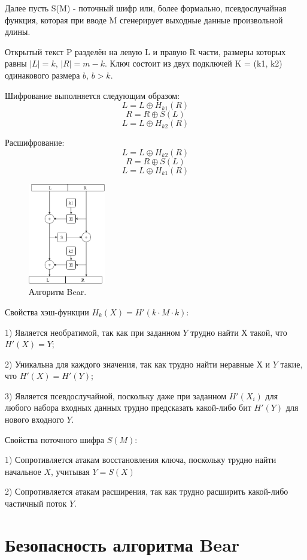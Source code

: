 \documentclass[12pt]{article}
\begin{document}
Далее пусть S(M) - поточный шифр или, более формально, псевдослучайная функция, которая при вводе M сгенерирует выходные данные произвольной длины.

Открытый текст P разделён на левую L и правую R части, размеры которых равны $|L| = k$, $|R| = m - k$. Ключ состоит из двух подключей K = (k1, k2) одинакового размера $b$, $b > k$.

Шифрование выполняется следующим образом:
\[L = L\oplus H_{k1}(R)\]
\[R = R\oplus S(L)\]
\[L = L\oplus H_{k2}(R)\]

Расшифрование:
\[L = L\oplus H_{k2}(R)\]
\[R = R\oplus S(L)\]
\[L = L\oplus H_{k1}(R)\]


\begin{figure}
\centering
\includegraphics[width=0.3\textwidth]{Bear.png}
\caption{\label{fig:Bear}Алгоритм Bear.}
\end{figure}
\vspace{5mm}
Свойства хэш-функции $H_{k}(X) = {H'(k\cdot M \cdot k)}$:

    1) Является необратимой, так как при заданном $Y$ трудно найти $Х$ такой, что $H'(X) = Y$;
   
    2) Уникальна для каждого значения, так как трудно найти неравные $Х$ и $Y$ такие, что $H'(X) = H'(Y)$;
    
    3) Является псевдослучайной, поскольку даже при заданном $H'(X_{i})$ для любого набора входных данных трудно предсказать какой-либо бит $H'(Y)$ для нового входного $Y$.
\vspace{5mm}

Свойства поточного шифра $S(M)$:

    1) Сопротивляется атакам восстановления ключа, поскольку трудно найти начальное $X$, учитывая $Y = S(X)$
    
    2) Сопротивляется атакам расширения, так как трудно расширить какой-либо частичный поток $Y$.

\section{Безопасность алгоритма Bear} 
\end{document}
